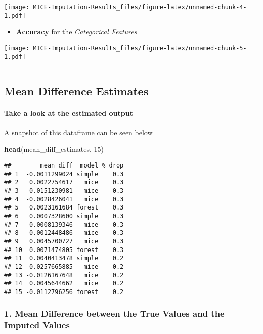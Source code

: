 \documentclass[]{article}
\newenvironment{Shaded}{\begin{snugshade}}{\end{snugshade}}
\newcommand{\DecValTok}[1]{\textcolor[rgb]{0.00,0.00,0.81}{#1}}
\newcommand{\KeywordTok}[1]{\textcolor[rgb]{0.13,0.29,0.53}{\textbf{#1}}}
\newcommand{\NormalTok}[1]{#1}
\providecommand{\tightlist}{%
  \setlength{\itemsep}{0pt}\setlength{\parskip}{0pt}}
\let\oldparagraph\paragraph
\renewcommand{\paragraph}[1]{\oldparagraph{#1}\mbox{}}
\begin{document}
\texttt{[image: MICE-Imputation-Results\_files/figure-latex/unnamed-chunk-4-1.pdf]}

\begin{itemize}
\tightlist
\item
  \textbf{Accuracy} for the \emph{Categorical Features}
\end{itemize}

\texttt{[image: MICE-Imputation-Results\_files/figure-latex/unnamed-chunk-5-1.pdf]}

\begin{center}\rule{0.5\linewidth}{0.5pt}\end{center}

\hypertarget{mean-difference-estimates}{%
\subsection{Mean Difference Estimates}\label{mean-difference-estimates}}

\hypertarget{take-a-look-at-the-estimated-output}{%
\paragraph{Take a look at the estimated
output}\label{take-a-look-at-the-estimated-output}}

A snapshot of this dataframe can be seen below

\begin{Shaded}
\begin{Highlighting}[]
\KeywordTok{head}\NormalTok{(mean_diff_estimates, }\DecValTok{15}\NormalTok{)}
\end{Highlighting}
\end{Shaded}

\begin{verbatim}
##        mean_diff  model % drop
## 1  -0.0011299024 simple    0.3
## 2   0.0022754617   mice    0.3
## 3   0.0151230981   mice    0.3
## 4  -0.0028426041   mice    0.3
## 5   0.0023161684 forest    0.3
## 6   0.0007328600 simple    0.3
## 7   0.0008139346   mice    0.3
## 8   0.0012448486   mice    0.3
## 9   0.0045700727   mice    0.3
## 10  0.0071474805 forest    0.3
## 11  0.0040413478 simple    0.2
## 12  0.0257665885   mice    0.2
## 13 -0.0126167648   mice    0.2
## 14  0.0045644662   mice    0.2
## 15 -0.0112796256 forest    0.2
\end{verbatim}

\hypertarget{mean-difference-between-the-true-values-and-the-imputed-values}{%
\subsubsection{1. Mean Difference between the True Values and the
Imputed
Values}\label{mean-difference-between-the-true-values-and-the-imputed-values}}
\end{document}
